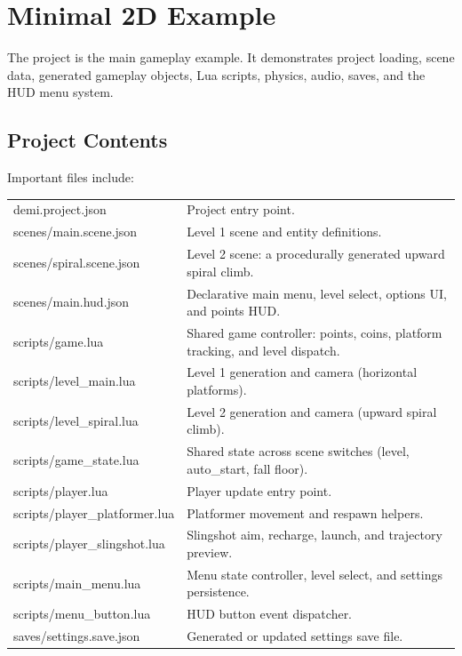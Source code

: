 \chapter{Minimal 2D Example}

The  project is the main gameplay example. It demonstrates project loading, scene data, generated gameplay objects, Lua scripts, physics, audio, saves, and the HUD menu system.

\section{Project Contents}

Important files include:

\begin{longtable}{>{\ttfamily}p{}p{}}
demi.project.json & Project entry point. \\
scenes/main.scene.json & Level 1 scene and entity definitions. \\
scenes/spiral.scene.json & Level 2 scene: a procedurally generated upward spiral climb. \\
scenes/main.hud.json & Declarative main menu, level select, options UI, and points HUD. \\
scripts/game.lua & Shared game controller: points, coins, platform tracking, and level dispatch. \\
scripts/level\_main.lua & Level 1 generation and camera (horizontal platforms). \\
scripts/level\_spiral.lua & Level 2 generation and camera (upward spiral climb). \\
scripts/game\_state.lua & Shared state across scene switches (level, auto\_start, fall floor). \\
scripts/player.lua & Player update entry point. \\
scripts/player\_platformer.lua & Platformer movement and respawn helpers. \\
scripts/player\_slingshot.lua & Slingshot aim, recharge, launch, and trajectory preview. \\
scripts/main\_menu.lua & Menu state controller, level select, and settings persistence. \\
scripts/menu\_button.lua & HUD button event dispatcher. \\
saves/settings.save.json & Generated or updated settings save file. \\
\end{longtable}


